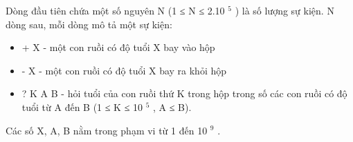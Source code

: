 Dòng đầu tiên chứa một số nguyên N (1 ≤ N ≤ 2.10   $^    5   $   ) là số lượng sự kiện. N dòng sau, mỗi dòng mô tả một sự kiện:  
\begin{itemize}
	\item     + X - một con ruồi có độ tuổi X bay vào hộp   
	\item     - X - một con ruồi có độ tuổi X bay ra khỏi hộp   
	\item     ? K A B - hỏi tuổi của con ruồi thứ K trong hộp trong số các con ruồi có độ tuổi từ A đến B (1 ≤ K ≤ 10    $^     5    $    , A ≤ B).   
\end{itemize}

   Các số X, A, B nằm trong phạm vi từ 1 đến 10   $^    9   $   .
